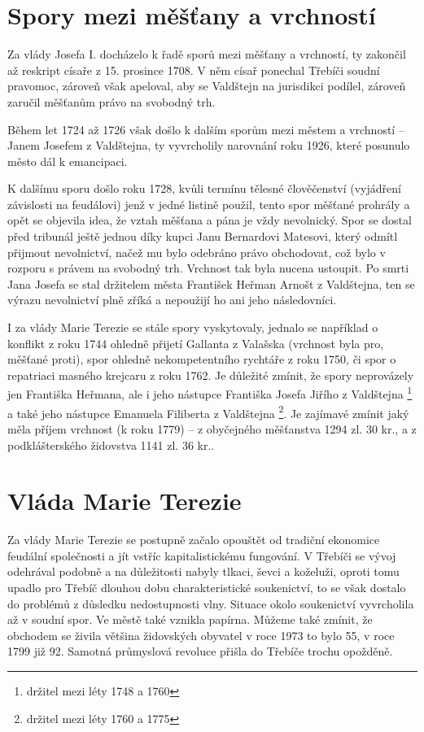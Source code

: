 \documentclass[a4paper,oneside,12p]{report}
\begin{document}
\section{Spory mezi měšťany a vrchností}

Za vlády Josefa I. docházelo k řadě sporů mezi měšťany a vrchností, ty zakončil až reskript císaře z 15. prosince 1708.
V něm císař ponechal Třebíči soudní pravomoc, zároveň však apeloval, aby se Valdštejn na jurisdikci podílel, zároveň zaručil měšťanům právo na svobodný trh.

Během let 1724 až 1726 však došlo k dalším sporům mezi městem a vrchností -- Janem Josefem z Valdštejna, ty vyvrcholily narovnání roku 1926, které posunulo město dál k emancipaci.

K dalšímu sporu došlo roku 1728, kvůli termínu tělesné člověčenství (vyjádření závislosti na feudálovi) jenž v jedné listině použil, tento spor měšťané prohrály a opět se objevila idea, že vztah měšťana a pána je vždy nevolnický.
Spor se dostal před tribunál ještě jednou díky kupci Janu Bernardovi Matesovi, který odmítl přijmout nevolnictví, načež mu bylo odebráno právo obchodovat, což bylo v rozporu s právem na svobodný trh.
Vrchnost tak byla nucena ustoupit.
Po smrti Jana Josefa se stal držitelem města František Heřman Arnošt z Valdštejna, ten se výrazu nevolnictví plně zříká a nepoužijí ho ani jeho následovníci. %

I za vlády Marie Terezie se stále spory vyskytovaly, jednalo se například o konflikt z roku 1744 ohledně přijetí Gallanta z Valašska (vrchnost byla pro, měšťané proti), spor ohledně nekompetentního rychtáře z roku 1750, či spor o repatriaci masného krejcaru z roku 1762.
Je důležité zmínit, že spory neprovázely jen Františka Heřmana, ale i jeho nástupce Františka Josefa Jiřího z Valdštejna \footnote{držitel mezi léty 1748 a 1760} a také jeho nástupce Emanuela Filiberta z Valdštejna \footnote{držitel mezi léty 1760 a 1775}.
Je zajímavé zmínit jaký měla příjem vrchnost (k roku 1779) -- z obyčejného měšťanstva 1294 zl. 30 kr., a z podklášterského židovstva 1141 zl. 36 kr.. %

\section{Vláda Marie Terezie}

Za vlády Marie Terezie se postupně začalo opouštět od tradiční ekonomice feudální společnosti a jít vstříc kapitalistickému fungování.
V Třebíči se vývoj odehrával podobně a na důležitosti nabyly tlkaci, ševci a koželuži, oproti tomu upadlo pro Třebíč dlouhou dobu charakteristické soukenictví, to se však dostalo do problémů z důsledku nedostupnosti vlny.
Situace okolo soukenictví vyvrcholila až v soudní spor.
Ve městě také vznikla papírna.
Můžeme také zmínit, že obchodem se živila většina židovských obyvatel v roce 1973 to bylo 55, v roce 1799 již 92.
Samotná průmyslová revoluce přišla do Třebíče trochu opožděně. %
\end{document}
